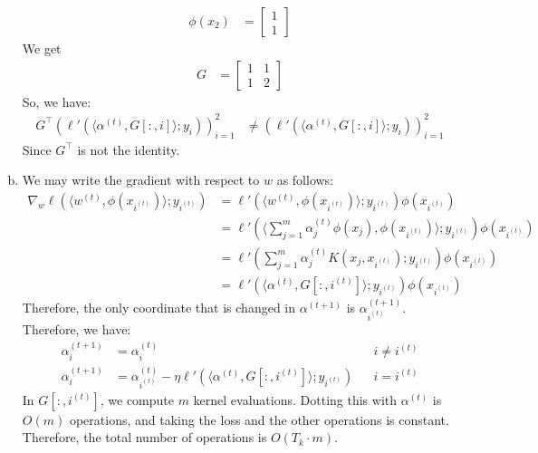 \documentclass{amsart}
\theoremstyle{definition}
\begin{document}
\begin{enumerate}[(a)]
\begin{align*}
      \phi(x_2) &= \begin{bmatrix}
        1\\
        1
      \end{bmatrix}
    \end{align*}
    We get 
    \begin{align*}
      G &= \begin{bmatrix}
        1 & 1\\
        1 & 2
      \end{bmatrix}
    \end{align*}
    So, we have:
    \begin{align*}
      G^\top (\ell'(\langle \alpha^{(t)}, G[:, i] \rangle; y_i))_{i=1}^{2} &\neq (\ell'(\langle \alpha^{(t)}, G[:, i] \rangle; y_i))_{i=1}^{2}
    \end{align*}
    Since $G^\top$ is not the identity.
  \item
    We may write the gradient with respect to $w$ as follows:
    \begin{align*}
      \nabla_w \ell(\langle w^{(t)}, \phi(x_{i^{(t)}})\rangle; y_{i^{(t)}}) &= \ell'(\langle w^{(t)}, \phi(x_{i^{(t)}})\rangle; y_{i^{(t)}}) \phi(x_{i^{(t)}})\\
      &= \ell'(\langle \sum_{j=1}^{m} \alpha_j^{(t)} \phi(x_j), \phi(x_{i^{(t)}})\rangle; y_{i^{(t)}}) \phi(x_{i^{(t)}})\\
      &= \ell'(\sum_{j=1}^{m} \alpha_j^{(t)} K(x_j, x_{i^{(t)}}); y_{i^{(t)}}) \phi(x_{i^{(t)}})\\
      &= \ell'(\langle \alpha^{(t)}, G[:, i^{(t)}] \rangle; y_{i^{(t)}}) \phi(x_{i^{(t)}})
    \end{align*}
    Therefore, the only coordinate that is changed in $\alpha^{(t+1)}$ is $\alpha_{i^{(t)}}^{(t+1)}$.
    Therefore, we have:
    \begin{align*}
      \alpha_{i}^{(t+1)} &= \alpha_{i}^{(t)} &&i \neq i^{(t)}\\
      \alpha_{i}^{(t+1)} &= \alpha_{i^{(t)}}^{(t)} - \eta \ell'(\langle \alpha^{(t)}, G[:, i^{(t)}] \rangle; y_{i^{(t)}}) && i = i^{(t)}
    \end{align*}
    In $G[:, i^{(t)}]$, we compute $m$ kernel evaluations. Dotting this with $\alpha^{(t)}$ is $O(m)$ operations, and taking the loss and the other operations is constant. 
    Therefore, the total number of operations is $O(T_k \cdot m)$.
\end{enumerate}
\end{document}
